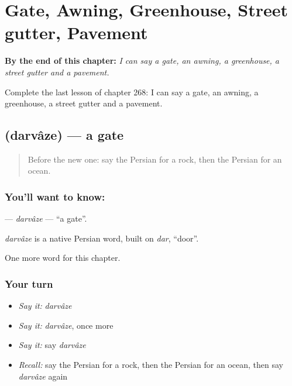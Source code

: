 
\chapter{Gate, Awning, Greenhouse, Street gutter, Pavement}
\label{ch:fa-gate-awning-greenhouse-street-gutter-pavement}

\begin{chapteropening}
\textbf{By the end of this chapter:} \emph{I can say a gate, an awning, a greenhouse, a street gutter and a pavement.}

Complete the last lesson of chapter 268: I can say a gate, an awning, a greenhouse, a street gutter and a pavement.
\end{chapteropening}

\section[\texorpdfstring{\fa{دروازه} (darvâze)}{دروازه (darvâze)}]{ (darvâze) — a gate}

\label{lesson:FA-C268-darvaze}



\begin{quote}
Before the new one: say the Persian for a rock, then the Persian for an ocean.
\end{quote}

\subsection*{You'll want to know: }
\textbf{} — \emph{darvâze} — \textquotedblleft{}a gate\textquotedblright{}.

\begin{cousinweb}
\emph{darvâze} is a native Persian word, built on \emph{dar}, \textquotedblleft{}door\textquotedblright{}.
\end{cousinweb}

\begin{grammarlens}[title={What you've built}]
One more word for this chapter.
\end{grammarlens}

\subsection*{Your turn}
\begin{itemize}
\raggedright
  \item \emph{Say it:} \emph{darvâze}
  \item \emph{Say it:} \emph{darvâze}, once more
  \item \emph{Say it:} say \emph{darvâze}
  \item \emph{Recall:} say the Persian for a rock, then the Persian for an ocean, then say \emph{darvâze} again
\end{itemize}

